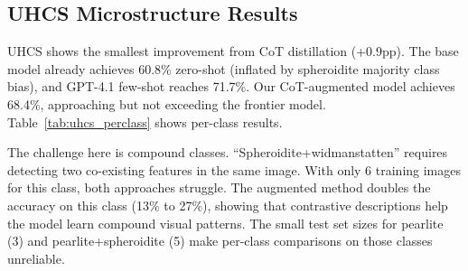 \documentclass{bmvc2k}
\begin{document}
\subsection{UHCS Microstructure Results}

UHCS shows the smallest improvement from CoT distillation (+0.9pp). The base model already achieves 60.8\% zero-shot (inflated by spheroidite majority class bias), and GPT-4.1 few-shot reaches 71.7\%. Our CoT-augmented model achieves 68.4\%, approaching but not exceeding the frontier model. Table~\ref{tab:uhcs_perclass} shows per-class results.

The challenge here is compound classes. ``Spheroidite+widmanstatten'' requires detecting two co-existing features in the same image. With only 6 training images for this class, both approaches struggle. The augmented method doubles the accuracy on this class (13\% to 27\%), showing that contrastive descriptions help the model learn compound visual patterns. The small test set sizes for pearlite (3) and pearlite+spheroidite (5) make per-class comparisons on those classes unreliable.
\end{document}

